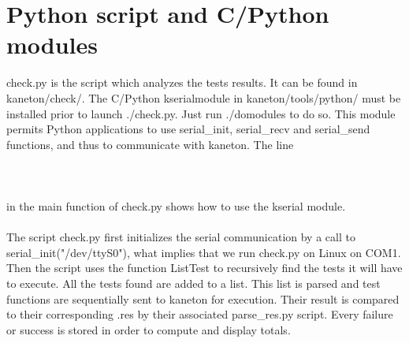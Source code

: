 \section{Python script and C/Python modules}

check.py is the script which analyzes the tests results. It  can be found in
kaneton/check/. The C/Python kserialmodule in kaneton/tools/python/ must be
installed prior to launch ./check.py. Just run ./domodules to do so. This
module permits Python applications to use serial\_init, serial\_recv and
serial\_send functions, and thus to communicate with kaneton. The line\\
\\
\\
\\
in the main function of check.py shows how to use the kserial module.\\
\\
\indent The script check.py first initializes the serial communication by a
call to serial\_init("/dev/ttyS0"), what implies that we run check.py on Linux
on COM1. Then the script uses the function ListTest to recursively find the tests
it will have to execute. All the tests found are added to a list. This list is
parsed and test functions are sequentially sent to kaneton for execution. Their
result is compared to their corresponding .res by their associated
parse\_res.py script. Every failure or success is stored in order to compute
and display totals.


